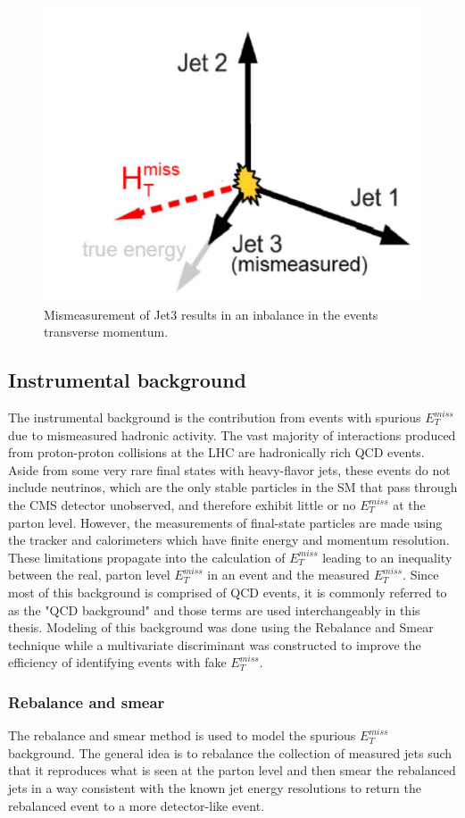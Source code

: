 \begin{figure}
	\centering
	\includegraphics[width=0.5\linewidth]{Figures/FakeMET}
	\caption{Mismeasurement of Jet3 results in an inbalance in the events transverse momentum.}
	\label{fig:fakemet}
\end{figure}

\subsection{Instrumental background}
The instrumental background is the contribution from events with spurious $E^{miss}_T$ due to mismeasured hadronic activity.  The vast majority of interactions produced from proton-proton collisions at the LHC are hadronically rich QCD events.  Aside from some very rare final states with heavy-flavor jets, these events do not include neutrinos, which are the only stable particles in the SM that pass through the CMS detector unobserved, and therefore exhibit little or no $E^{miss}_T$ at the parton level.  However, the measurements of final-state particles are made using the tracker and calorimeters which have finite energy and momentum resolution.  These limitations propagate into the calculation of $E^{miss}_T$ leading to an inequality between the real, parton level $E^{miss}_T$ in an event and the measured $E^{miss}_T$.  Since most of this background is comprised of QCD events, it is commonly referred to as the "QCD background" and those terms are used interchangeably in this thesis.  Modeling of this background was done using the Rebalance and Smear technique while a multivariate discriminant was constructed to improve the efficiency of identifying events with fake $E^{miss}_T$.

\subsubsection{Rebalance and smear}
The rebalance and smear method is used to model the spurious $E^{miss}_T$ background.  The general idea is to rebalance the collection of measured jets such that it reproduces what is seen at the parton level and then smear the rebalanced jets in a way consistent with the known jet energy resolutions to return the rebalanced event to a more detector-like event.

